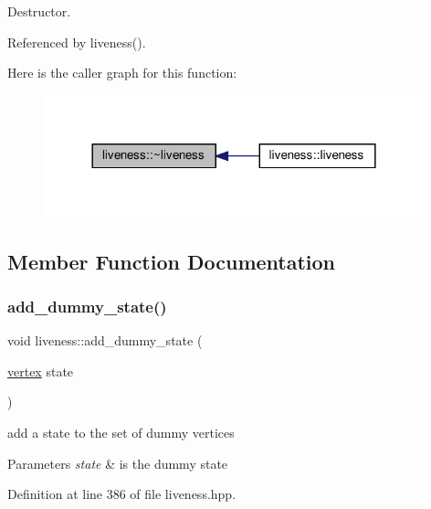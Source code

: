 Destructor. 



Referenced by liveness().

Here is the caller graph for this function\+:
\nopagebreak
\begin{figure}[H]
\begin{center}
\leavevmode
\includegraphics[width=312pt]{d3/d1f/classliveness_ad99bfcdba90d09aabd32a65e79d05f36_icgraph}
\end{center}
\end{figure}


\subsection{Member Function Documentation}
\mbox{\label{classliveness_a8703aab0a7ace68883d5e7118f0dd2f1}} 
\subsubsection{\texorpdfstring{add\+\_\+dummy\+\_\+state()}{add\_dummy\_state()}}
{\footnotesize\ttfamily void liveness\+::add\+\_\+dummy\+\_\+state (\begin{DoxyParamCaption}\item[{\hyperlink{graph_8hpp_abefdcf0544e601805af44eca032cca14}{vertex}}]{state }\end{DoxyParamCaption})\hspace{0.3cm}{\ttfamily [inline]}}



add a state to the set of dummy vertices 


\begin{DoxyParams}{Parameters}
{\em state} & is the dummy state \\
\hline
\end{DoxyParams}


Definition at line 386 of file liveness.\+hpp.



